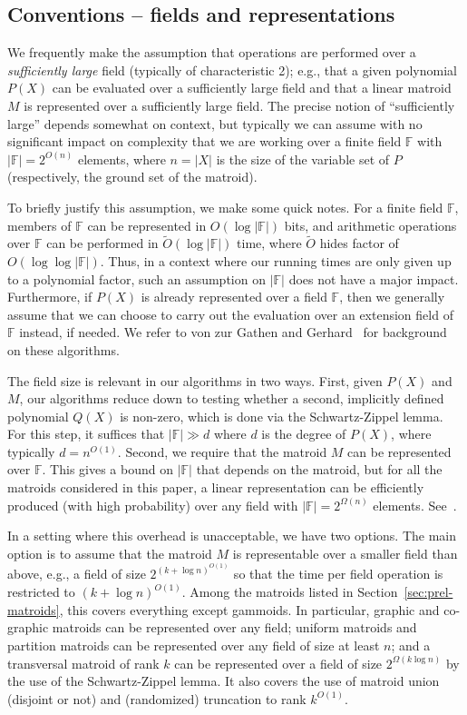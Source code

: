 \documentclass{theoretics}
\newcommand{\F}{\ensuremath{\mathbb F}\xspace}
\begin{document}
\subsection{Conventions -- fields and representations}
\label{subsec:conventions}
We frequently make the assumption that operations are performed over a
\emph{sufficiently large} field (typically of characteristic 2); e.g.,
that a given polynomial $P(X)$ can be evaluated over a sufficiently
large field and that a linear matroid $M$ is represented over a
sufficiently large field. The precise notion of ``sufficiently large''
depends somewhat on context, but typically we can assume with no
significant impact on complexity that we are working over a finite field $\F$ with
$|\F|=2^{O(n)}$ elements, where $n=|X|$ is the size of the variable
set of $P$ (respectively, the ground set of the matroid). 

To briefly justify this assumption, we make some quick notes. 
For a finite field $\F$, members of $\F$ can be represented in $O(\log |\F|)$ bits, 
and arithmetic operations over $\F$ can be performed in $\tilde O(\log |\F|)$ time,
where $\tilde O$ hides factor of $O(\log \log |\F|)$. Thus,
in a context where our running times are only given up to a polynomial
factor, such an assumption on $|\F|$ does not have a major impact.
Furthermore, if $P(X)$ is already represented over a field $\F$,
then we generally assume that we can choose to carry out the
evaluation over an extension field of $\F$ instead, if needed.
We refer to von zur Gathen and Gerhard~\cite{vzGathen-MCA} for
background on these algorithms. 

The field size is relevant in our algorithms in two ways. First,
given $P(X)$ and $M$, our algorithms reduce down to testing whether a
second, implicitly defined polynomial $Q(X)$ is non-zero, which
is done via the Schwartz-Zippel lemma. For this step, it suffices
that $|\F| \gg d$ where $d$ is the degree of $P(X)$, where
typically $d=n^{O(1)}$. Second, we require that the matroid $M$ can be
represented over $\F$. This gives a bound on $|\F|$ that depends on
the matroid, but for all the matroids considered in this paper,
a linear representation can be efficiently produced (with high probability)
over any field with $|\F|=2^{\Omega(n)}$ elements. See~\cite{OxleyBook,Marx09-matroid}.

In a setting where this overhead is unacceptable, we have two options.
The main option is to assume that the matroid $M$ is representable over
a smaller field than above, e.g., a field of size $2^{(k+\log n)^{O(1)}}$
so that the time per field operation is restricted to $(k+\log n)^{O(1)}$.
Among the matroids listed in Section~\ref{sec:prel-matroids},
this covers everything except gammoids. In particular, 
graphic and co-graphic matroids can be represented over
any field; uniform matroids and partition matroids can be represented over any field of size at least $n$;  
and a transversal matroid of rank $k$ can be represented over a field
of size $2^{\Omega(k \log n)}$ by the use of the Schwartz-Zippel lemma.
It also covers the use of matroid union (disjoint or not)
and (randomized) truncation to rank $k^{O(1)}$.
\end{document}
